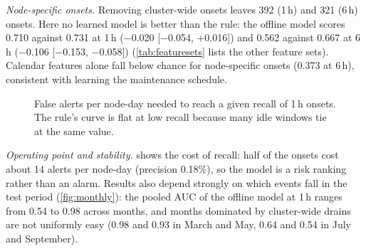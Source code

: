 \emph{Node-specific onsets.} Removing cluster-wide onsets leaves 392 (1\,h) and 321 (6\,h) onsets. Here no learned model is better than the rule: the offline model scores 0.710 against 0.731 at 1\,h ($-$0.020 [$-$0.054, +0.016]) and 0.562 against 0.667 at 6\,h ($-$0.106 [$-$0.153, $-$0.058]) (\cref{tab:featuresets} lists the other feature sets). Calendar features alone fall below chance for node-specific onsets (0.373 at 6\,h), consistent with learning the maintenance schedule.

\begin{figure}[t]
\centering
{}
\caption{False alerts per node-day needed to reach a given recall of 1\,h onsets. The rule's curve is flat at low recall because many idle windows tie at the same value.}
\label{fig:operating}
\end{figure}

\begin{table}[t]
\caption{Offline GBT by feature set: mean per-node AUC for all and node-specific onsets.}
\label{tab:featuresets}
\centering\small

\end{table}

\emph{Operating point and stability.}  shows the cost of recall: half of the onsets cost about 14 alerts per node-day (precision 0.18\%), so the model is a risk ranking rather than an alarm. Results also depend strongly on which events fall in the test period (\cref{fig:monthly}): the pooled AUC of the offline model at 1\,h ranges from 0.54 to 0.98 across months, and months dominated by cluster-wide drains are not uniformly easy (0.98 and 0.93 in March and May, 0.64 and 0.54 in July and September).

